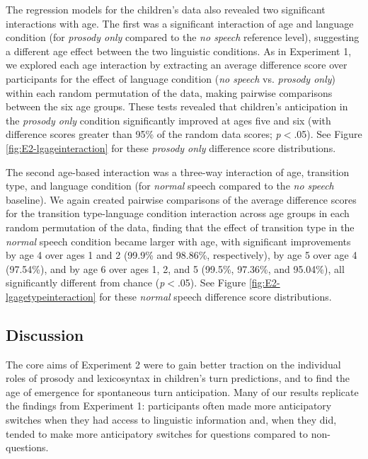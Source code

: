\documentclass[authoryear, 12pt]{elsarticle}
\begin{document}
The regression models for the children's data also revealed two significant interactions with age. The first was a significant interaction of age and language condition (for \textit{prosody only} compared to the \textit{no speech} reference level), suggesting a different age effect between the two linguistic conditions. As in Experiment 1, we explored each age interaction by extracting an average difference score over participants for the effect of language condition (\textit{no speech} vs. \textit{prosody only}) within each random permutation of the data, making pairwise comparisons between the six age groups. These tests revealed that children's anticipation in the \textit{prosody only} condition significantly improved at ages five and six (with difference scores greater than 95\% of the random data scores; \textit{p}$<$.05). See Figure \ref{fig:E2-lgageinteraction} for these \textit{prosody only} difference score distributions.

The second age-based interaction was a three-way interaction of age, transition type, and language condition (for \textit{normal} speech compared to the \textit{no speech} baseline). We again created pairwise comparisons of the average difference scores for the transition type-language condition interaction across age groups in each random permutation of the data, finding that the effect of transition type in the \textit{normal} speech condition became larger with age, with significant improvements by age 4 over ages 1 and 2 (99.9\% and 98.86\%, respectively), by age 5 over age 4 (97.54\%), and by age 6 over ages 1, 2, and 5 (99.5\%, 97.36\%, and 95.04\%), all significantly different from chance (\textit{p}$<$.05). See Figure \ref{fig:E2-lgagetypeinteraction} for these \textit{normal} speech difference score distributions.

\subsection*{Discussion}
\label{sec:discussion2}

The core aims of Experiment 2 were to gain better traction on the individual roles of prosody and lexicosyntax in children's turn predictions, and to find the age of emergence for spontaneous turn anticipation. Many of our results replicate the findings from Experiment 1: participants often made more anticipatory switches when they had access to linguistic information and, when they did, tended to make more anticipatory switches for questions compared to non-questions. 
\end{document}
